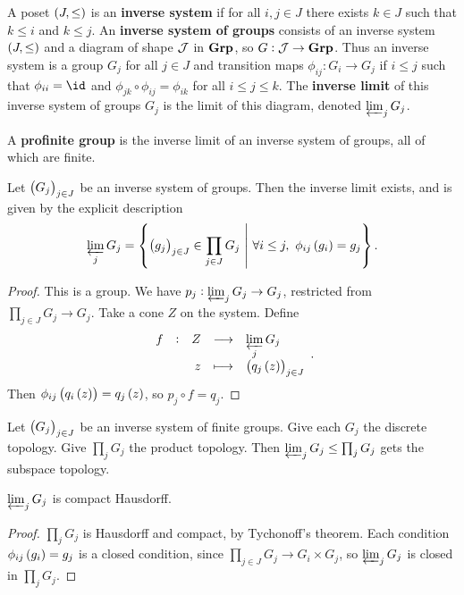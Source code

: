 \begin{definition}
A poset $ \br{J, \le} $ is an \textbf{inverse system} if for all $ i, j \in J $ there exists $ k \in J $ such that $ k \le i $ and $ k \le j $. An \textbf{inverse system of groups} consists of an inverse system $ \br{J, \le} $ and a diagram of shape $ \mathcal{J} $ in $ \textbf{Grp} $, so $ G : \mathcal{J} \to \textbf{Grp} $. Thus an inverse system is a group $ G_j $ for all $ j \in J $ and transition maps $ \phi_{ij} : G_i \to G_j $ if $ i \le j $ such that $ \phi_{ii} = \id $ and $ \phi_{jk} \circ \phi_{ij} = \phi_{ik} $ for all $ i \le j \le k $. The \textbf{inverse limit} of this inverse system of groups $ G_j $ is the limit of this diagram, denoted $ \varprojlim_j G_j $.
\end{definition}

\begin{definition}
A \textbf{profinite group} is the inverse limit of an inverse system of groups, all of which are finite.
\end{definition}

\begin{proposition}
Let $ \br{G_j}_{j \in J} $ be an inverse system of groups. Then the inverse limit exists, and is given by the explicit description
$$ \varprojlim_j G_j = \cbr{\br{g_j}_{j \in J} \in \prod_{j \in J} G_j \st \forall i \le j, \ \phi_{ij}\br{g_i} = g_j}. $$
\end{proposition}

\begin{proof}
This is a group. We have $ p_j : \varprojlim_j G_j \to G_j $, restricted from $ \prod_{j \in J} G_j \to G_j $. Take a cone $ Z $ on the system. Define
$$ \function[f]{Z}{\varprojlim_j G_j}{z}{\br{q_j\br{z}}_{j \in J}}. $$
Then $ \phi_{ij}\br{q_i\br{z}} = q_j\br{z} $, so $ p_j \circ f = q_j $.
\end{proof}


\begin{definition}
Let $ \br{G_j}_{j \in J} $ be an inverse system of finite groups. Give each $ G_j $ the discrete topology. Give $ \prod_j G_j $ the product topology. Then $ \varprojlim_j G_j \le \prod_j G_j $ gets the subspace topology.
\end{definition}

\begin{proposition}
$ \varprojlim_j G_j $ is compact Hausdorff.
\end{proposition}

\begin{proof}
$ \prod_j G_j $ is Hausdorff and compact, by Tychonoff's theorem. Each condition $ \phi_{ij}\br{g_i} = g_j $ is a closed condition, since $ \prod_{j \in J} G_j \to G_i \times G_j $, so $ \varprojlim_j G_j $ is closed in $ \prod_j G_j $.
\end{proof}

